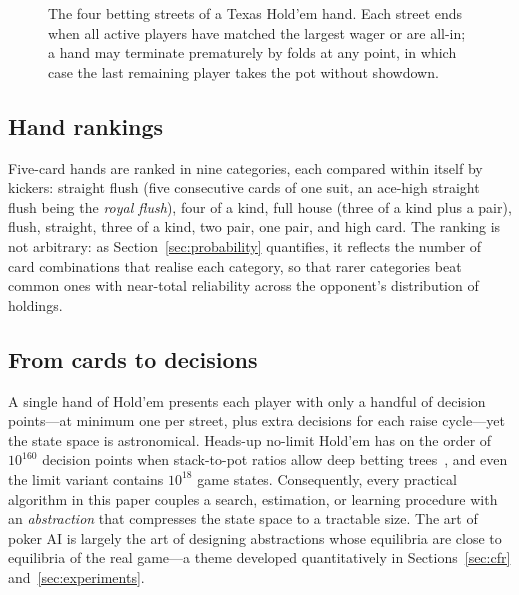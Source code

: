 \begin{figure}[htbp]
\centering
{}
\caption{The four betting streets of a Texas Hold'em hand. Each street ends when all active players have matched the largest wager or are all-in; a hand may terminate prematurely by folds at any point, in which case the last remaining player takes the pot without showdown.}
\label{fig:streets}
\end{figure}

\subsection{Hand rankings}\label{sec:rankings}

Five-card hands are ranked in nine categories, each compared within itself by kickers: straight flush (five consecutive cards of one suit, an ace-high straight flush being the \emph{royal flush}), four of a kind, full house (three of a kind plus a pair), flush, straight, three of a kind, two pair, one pair, and high card. The ranking is not arbitrary: as Section~\ref{sec:probability} quantifies, it reflects the number of card combinations that realise each category, so that rarer categories beat common ones with near-total reliability across the opponent's distribution of holdings.

\subsection{From cards to decisions}

A single hand of Hold'em presents each player with only a handful of decision points---at minimum one per street, plus extra decisions for each raise cycle---yet the state space is astronomical. Heads-up no-limit Hold'em has on the order of $10^{160}$ decision points when stack-to-pot ratios allow deep betting trees~\cite{sandholm2015abstraction}, and even the limit variant contains $10^{18}$ game states. Consequently, every practical algorithm in this paper couples a search, estimation, or learning procedure with an \emph{abstraction} that compresses the state space to a tractable size. The art of poker AI is largely the art of designing abstractions whose equilibria are close to equilibria of the real game---a theme developed quantitatively in Sections~\ref{sec:cfr} and~\ref{sec:experiments}.
